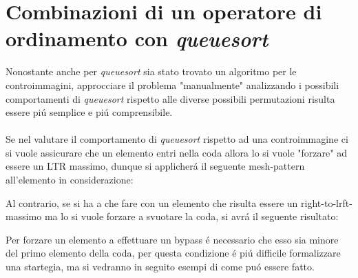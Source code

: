 \section*{Combinazioni di un operatore di ordinamento con \textit{queuesort}}
Nonostante anche per \textit{queuesort} sia stato trovato un algoritmo per le controimmagini\cite{magnusson2013sorting}, approcciare il problema "manualmente" analizzando i possibili comportamenti di \textit{queuesort} rispetto alle diverse possibili permutazioni risulta essere pi\'u semplice e pi\'u comprensibile.\\\\
Se nel valutare il comportamento di \textit{queuesort} rispetto ad una controimmagine ci si vuole assicurare che un elemento entri nella coda allora lo si vuole "forzare" ad essere un LTR massimo, dunque si applicher\'a il seguente mesh-pattern all'elemento in considerazione:
\begin{center}
\end{center}
Al contrario, se si ha a che fare con un elemento che risulta essere un right-to-lrft-massimo ma lo si vuole forzare a svuotare la coda, si avr\'a il seguente risultato:
\begin{center}
\end{center}
Per forzare un elemento a effettuare un bypass \'e necessario che esso sia minore del primo elemento della coda, per questa condizione \'e pi\'u difficile formalizzare una startegia, ma si vedranno in seguito esempi di come pu\'o essere fatto. 

